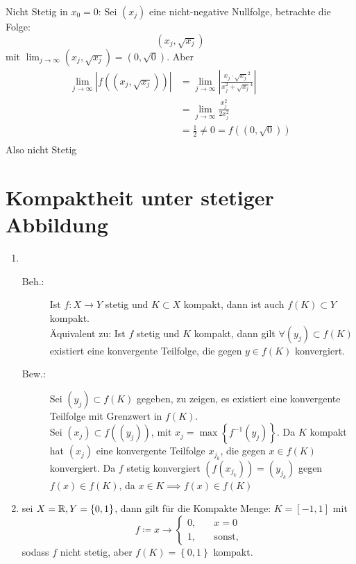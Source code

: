 \documentclass[sectionformat=aufgabe]{gadsescript}
\begin{document}
\begin{enumerate}[label=(\alph*)]
		Nicht Stetig in $ x_0 = 0 $: Sei $ (x_j) $ eine nicht-negative Nullfolge, betrachte die Folge:
		\[
			\left(x_j, \sqrt{x_j}\right)
		\]
		mit $ \lim_{j \to \infty} \left(x_j, \sqrt{x_j} \right)  = \left(0, \sqrt{0} \right) $.
		Aber
		\begin{align*}
			\lim_{j \to \infty} \left| f\left( \left( x_j, \sqrt{x_j}  \right)  \right)  \right|
			&= \lim_{j \to \infty} \left| \frac{ x_j \cdot \sqrt{x_j}^2 }{ x_j^2 + \sqrt{x_j} ^4 } \right|  \\
			&= \lim_{j \to \infty} \frac{ x_j^2 }{ 2 x_j^2 }  \\
			&= \frac{ 1 }{ 2 } \neq 0 = f\left( \left( 0, \sqrt{0}  \right)  \right)  \\
		\end{align*}
		Also nicht Stetig
\end{enumerate}

\section{Kompaktheit unter stetiger Abbildung}
\begin{enumerate}[label=(\alph*)]
	\item ~
		\begin{description}
			\item[Beh.:] Ist $ f : X \to Y $ stetig und $ K \subset X $ kompakt, dann ist auch $ f(K) \subset Y $ kompakt.\\
				Äquivalent zu: Ist $ f $ stetig und $ K $ kompakt, dann gilt $ \forall (y_j) \subset f(K) $ existiert eine konvergente Teilfolge, die gegen $ y \in f(K) $ konvergiert.
			\item[Bew.:] 
				Sei $ (y_j) \subset f(K) $ gegeben, zu zeigen, es existiert eine konvergente Teilfolge mit Grenzwert in $ f(K) $.\\
				Sei $ (x_j) \subset f((y_j)) $, mit $ x_j = \max \left\{ f^{-1} (y_j) \right\} $.
				Da $ K $ kompakt hat $ (x_j) $ eine konvergente Teilfolge $ x_{j_k}  $, die gegen $ x \in f(K) $ konvergiert.
				Da $ f $ stetig konvergiert $ (f(x_{j_k} )) = (y_{j_k} )  $ gegen $ f(x) \in f(K) $, da $ x \in K \implies f(x) \in f(K)$
		\end{description}
		
	\item sei $ X = \mathbb{R} , Y = \left\{ 0, 1 \right\}  $, dann gilt für die Kompakte Menge: $ K = [-1, 1] $ mit
		\[
			f \coloneqq x \to \begin{cases}
				0, & \quad x = 0\\
				1, & \quad \text{sonst},
			\end{cases} 
		\]
		sodass $ f $ nicht stetig, aber $ f(K) = \left\{ 0, 1 \right\}  $ kompakt.
\end{enumerate}
\end{document}
